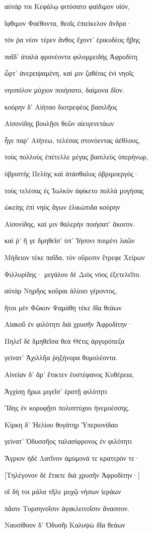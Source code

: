 \begin{pages}
\begin{Leftside}
αὐτάρ τοι Κεφάλῳ φιτύσατο φαίδιμον υἱόν, 

ἴφθιμον Φαέθοντα, θεοῖς ἐπιείκελον ἄνδρα· 

τόν ῥα νέον τέρεν ἄνθος ἔχοντ' ἐρικυδέος ἥβης

παῖδ' ἀταλὰ φρονέοντα φιλομμειδὴς Ἀφροδίτη

ὦρτ' ἀνερειψαμένη, καί μιν ζαθέοις ἐνὶ νηοῖς  

νηοπόλον μύχιον ποιήσατο, δαίμονα δῖον. 

κούρην δ' Αἰήταο διοτρεφέος βασιλῆος

Αἰσονίδης βουλῇσι θεῶν αἰειγενετάων

ἦγε παρ' Αἰήτεω, τελέσας στονόεντας ἀέθλους,

τοὺς πολλοὺς ἐπέτελλε μέγας βασιλεὺς ὑπερήνωρ, 

ὑβριστὴς Πελίης καὶ ἀτάσθαλος ὀβριμοεργός· 

τοὺς τελέσας ἐς Ἰωλκὸν ἀφίκετο πολλὰ μογήσας

ὠκείης ἐπὶ νηὸς ἄγων ἑλικώπιδα κούρην

Αἰσονίδης, καί μιν θαλερὴν ποιήσατ' ἄκοιτιν.

καί ῥ' ἥ γε δμηθεῖσ' ὑπ' Ἰήσονι ποιμένι λαῶν  

Μήδειον τέκε παῖδα, τὸν οὔρεσιν ἔτρεφε Χείρων

Φιλλυρίδης· μεγάλου δὲ Διὸς νόος ἐξετελεῖτο. 

αὐτὰρ Νηρῆος κοῦραι ἁλίοιο γέροντος,

ἤτοι μὲν Φῶκον Ψαμάθη τέκε δῖα θεάων

Αἰακοῦ ἐν φιλότητι διὰ χρυσῆν Ἀφροδίτην·  

Πηλεῖ δὲ δμηθεῖσα θεὰ Θέτις ἀργυρόπεζα

γείνατ' Ἀχιλλῆα ῥηξήνορα θυμολέοντα.

Αἰνείαν δ' ἄρ' ἔτικτεν ἐυστέφανος Κυθέρεια,

Ἀγχίσῃ ἥρωι μιγεῖσ' ἐρατῇ φιλότητι 

Ἴδης ἐν κορυφῇσι πολυπτύχου ἠνεμοέσσης. 

Κίρκη δ' Ἠελίου θυγάτηρ Ὑπεριονίδαο

γείνατ' Ὀδυσσῆος ταλασίφρονος ἐν φιλότητι

Ἄγριον ἠδὲ Λατῖνον ἀμύμονά τε κρατερόν τε· 

{[}Τηλέγονον δὲ ἔτικτε διὰ χρυσῆν Ἀφροδίτην·{]}

οἳ δή τοι μάλα τῆλε μυχῷ νήσων ἱεράων 

πᾶσιν Τυρσηνοῖσιν ἀγακλειτοῖσιν ἄνασσον.

Ναυσίθοον δ' Ὀδυσῆι Καλυψὼ δῖα θεάων


\end{Leftside}
\end{pages}
